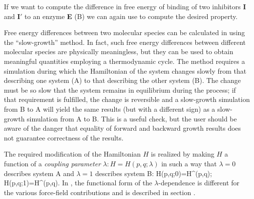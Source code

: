 If we want to compute the difference in free energy of binding of two
inhibitors {\bf I} and {\bf I$\prime$} to an enzyme {\bf E} (B)
we can again use  to compute the desired property.

\newcommand{\sA}{^{\mathrm{A}}}
\newcommand{\sB}{^{\mathrm{B}}}
Free energy differences between two molecular species can
be calculated in {\gromacs} using the ``slow-growth'' method. In fact,
such free energy differences between different molecular species are
physically meaningless, but they can be used to obtain meaningful
quantities employing a thermodynamic cycle.
The method requires a simulation during which the Hamiltonian of the
system changes slowly from that describing one system (A) to that
describing the other system (B). The change must be so slow that the
system remains in equilibrium during the process; if that requirement
is fulfilled, the change is reversible and a slow-growth simulation from B to A
will yield the same results (but with a different sign) as a slow-growth
simulation from A to B. This is a useful check, but the user should be
aware of the danger that equality of forward and backward growth results does
not guarantee correctness of the results.

The required modification of the Hamiltonian $H$ is realized by making
$H$ a function of a \textit{coupling parameter} $\lambda:
H=H(p,q;\lambda)$ in such a way that $\lambda=0$ describes system A
and $\lambda=1$ describes system B: 
\beq
  H(p,q;0)=H\sA (p,q);~~~~ H(p,q;1)=H\sB (p,q).
\eeq
In {\gromacs}, the functional form of the $\lambda$-dependence is
different for the various force-field contributions and is described
in section .

